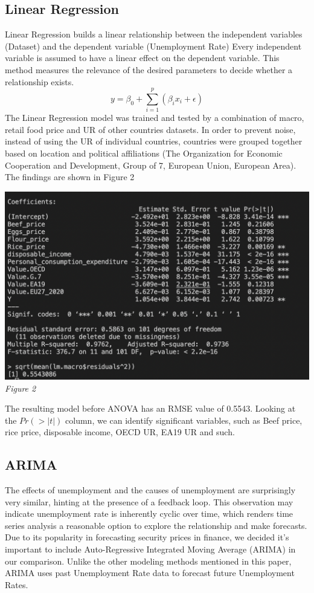 \documentclass{article}
\begin{document}
	\subsection{Linear Regression}
	Linear Regression builds a linear relationship between the independent variables (Dataset) and the dependent variable (Unemployment Rate) Every independent variable is assumed to have a linear effect on the dependent variable. This method measures the relevance of the desired parameters to decide whether a relationship exists.
	\begin{equation}
		y= \beta_0 + \sum_{i=1}^{p}(\beta_{i}x_i+\epsilon)
	\end{equation}
	The Linear Regression model was trained and tested by a combination of macro, retail food price and UR of other countries datasets. In order to prevent noise, instead of using the UR of individual countries, countries were grouped together based on location and political affiliations (The Organization for Economic Cooperation and Development, Group of 7, European Union, European Area). The findings are shown in Figure 2
	
	
	\begin{center}
		\includegraphics[width=1\textwidth]{assets/linReg.png}
		\textit{Figure 2}
	\end{center}
	The resulting model before ANOVA has an RMSE value of 0.5543. Looking at the $Pr(>|t|)$ column, we can 
	identify significant variables, such as Beef price, rice price, disposable income, OECD UR, EA19 UR and such.
	\subsection{ARIMA}
	The effects of unemployment and the causes of unemployment are surprisingly very similar, hinting at the presence of a feedback loop. This observation may indicate unemployment rate is inherently cyclic over time, which renders time series analysis a reasonable option to explore the relationship and make forecasts. Due to its popularity in forecasting security prices in finance, we decided it’s important to include Auto-Regressive Integrated Moving Average (ARIMA) in our comparison. Unlike the other modeling methods mentioned in this paper, ARIMA uses past Unemployment Rate data to forecast future Unemployment Rates.
\end{document}

